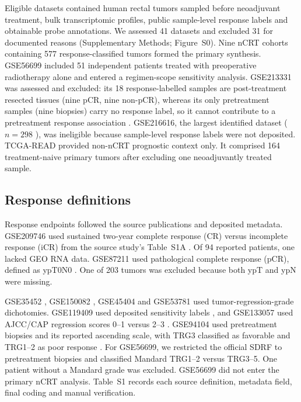 \documentclass[11pt,a4paper]{article}
\begin{document}
Eligible datasets contained human rectal tumors sampled before neoadjuvant treatment, bulk transcriptomic profiles, public sample-level response labels and obtainable probe annotations. We assessed 41 datasets and excluded 31 for documented reasons (Supplementary Methods; Figure~S0). Nine nCRT cohorts containing 577 response-classified tumors formed the primary synthesis. GSE56699 included 51 independent patients treated with preoperative radiotherapy alone \cite{Isella} and entered a regimen-scope sensitivity analysis. GSE213331 was assessed and excluded: its 18 response-labelled samples are post-treatment resected tissues (nine pCR, nine non-pCR), whereas its only pretreatment samples (nine biopsies) carry no response label, so it cannot contribute to a pretreatment response association \cite{He}. GSE216616, the largest identified dataset ($n=298$ \cite{Akiyoshi}), was ineligible because sample-level response labels were not deposited. TCGA-READ provided non-nCRT prognostic context only. It comprised 164 treatment-naive primary tumors after excluding one neoadjuvantly treated sample.

\subsection{Response definitions}

Response endpoints followed the source publications and deposited metadata. GSE209746 used sustained two-year complete response (CR) versus incomplete response (iCR) from the source study's Table~S1A \cite{Chatila}. Of 94 reported patients, one lacked GEO RNA data. GSE87211 used pathological complete response (pCR), defined as ypT0N0 \cite{Hu}. One of 203 tumors was excluded because both ypT and ypN were missing.

GSE35452 \cite{Watanabe}, GSE150082 \cite{Sendoya}, GSE45404 \cite{Agostini} and GSE53781 \cite{Palma} used tumor-regression-grade dichotomies. GSE119409 used deposited sensitivity labels \cite{Ji}, and GSE133057 used AJCC/CAP regression scores 0--1 versus 2--3 \cite{Ferrandon}. GSE94104 used pretreatment biopsies and its reported ascending scale, with TRG3 classified as favorable and TRG1--2 as poor response \cite{Alderdice}. For GSE56699, we restricted the official SDRF to pretreatment biopsies and classified Mandard TRG1--2 versus TRG3--5. One patient without a Mandard grade was excluded. GSE56699 did not enter the primary nCRT analysis. Table~S1 records each source definition, metadata field, final coding and manual verification.
\end{document}
